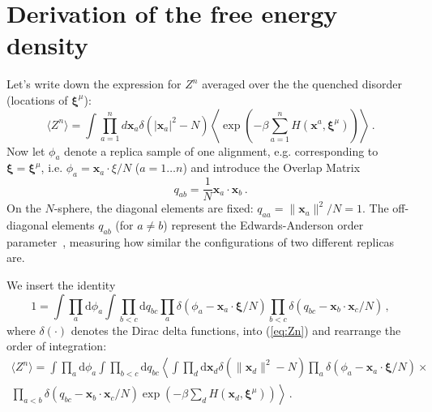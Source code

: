 \documentclass{article}
\newcommand{\dd}{{\mathrm{d}}}
\theoremstyle{plain}
\theoremstyle{definition}
\theoremstyle{remark}
\begin{document}



\newpage
\appendix
\onecolumn
\section{Derivation of the free energy density}

Let's write down the expression for $Z^n$ averaged over the the quenched disorder (locations of $\bm{\xi}^\mu$):
\begin{equation}
    \langle Z^n \rangle = \int \prod_{a=1}^n d\bm{x}_a \delta(|\bm{x}_a|^2 - N) \left\langle \exp\left(-\beta \sum_{a=1}^n H(\bm{x}^a, \bm{\xi}^\mu)\right) \right\rangle\,.
    \label{eq:Zn}
\end{equation}
Now let $\phi_a$ denote a replica sample of one alignment, e.g. corresponding to $\bm{\xi} = \bm{\xi}^\mu$, i.e. $\phi_a = \bm{x}_a \cdot \xi /N$ ($a=1\dots n$) and introduce the Overlap Matrix 
\begin{equation}
    q_{ab} = \frac{1}{N} \bm{x}_a \cdot \bm{x}_b\,.
\end{equation}
On the $N$-sphere, the diagonal elements are fixed: $q_{aa} =  \|\bm{x}_a\|^2/N = 1$. The off-diagonal elements $q_{ab}$ (for $a \neq b$) represent the Edwards-Anderson order parameter~\cite{ea75}, measuring how similar the configurations of two different replicas are.

We insert the identity 
\begin{equation}
1 = \int \prod_a \dd \phi_a \int \prod_{b<c} \dd q_{bc} \prod_a \delta\left(\phi_a - \bm{x}_a \cdot \bm{\xi}/N\right) \prod_{b<c} \delta\left(q_{bc} - \bm{x}_b \cdot \bm{x}_c/N\right)\,,
\end{equation}
where $\delta(\cdot)$ denotes the Dirac delta functions, into (\ref{eq:Zn}) and rearrange the order of integration:
\begin{multline}
\langle Z^n \rangle = \int \prod_a \dd \phi_a \int \prod_{b<c}  \dd q_{bc} \left\langle \int \prod_d \dd \bm{x}_d \delta(\|\bm{x}_d\|^2 - N) \prod_a \delta(\phi_a - \bm{x}_a \cdot \bm{\xi}/N) \right. \times \\
\left. \prod_{a<b} \delta(q_{bc} - \bm{x}_b \cdot \bm{x}_c/N) \exp\left(-\beta \sum_d H(\bm{x}_d, \bm{\xi}^\mu)\right) \right\rangle \,.
\end{multline}
\end{document}
